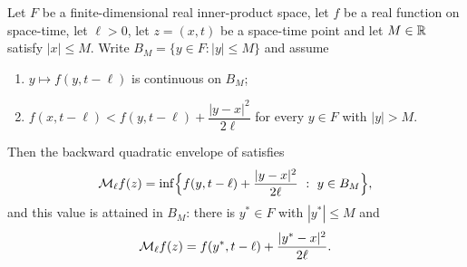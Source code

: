 \begin{lemma}
Let $F$ be a finite-dimensional real inner-product space, let $f$ be a real
function on space-time, let $\ell>0$, let $z=(x,t)$ be a space-time point and let
$M\in\mathbb{R}$ satisfy $|x|\le M$. Write $B_M=\{y\in F:|y|\le M\}$ and assume
\begin{enumerate}
\item[(a)] $y\mapsto f(y,t-\ell)$ is continuous on $B_M$;
\item[(b)] $f(x,t-\ell)<f(y,t-\ell)+\dfrac{|y-x|^2}{2\ell}$ for every $y\in F$
with $|y|>M$.
\end{enumerate}
Then the backward quadratic envelope of  satisfies
\[
  \mathcal{M}_\ell f(z)
  =\inf\Bigl\{f(y,t-\ell)+\frac{|y-x|^2}{2\ell}\ :\ y\in B_M\Bigr\},
\]
and this value is attained in $B_M$: there is $y^\ast\in F$ with $|y^\ast|\le M$
and
\[
  \mathcal{M}_\ell f(z)=f(y^\ast,t-\ell)+\frac{|y^\ast-x|^2}{2\ell}.
\]
\end{lemma}

